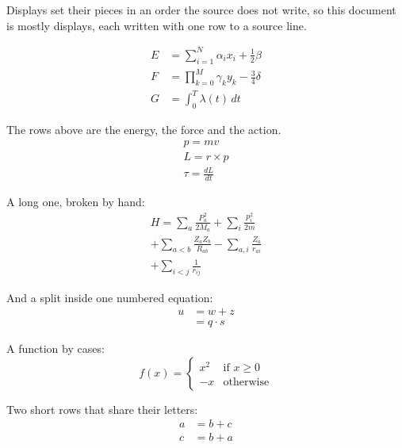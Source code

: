 \documentclass{article}
\begin{document}
Displays set their pieces in an order the source does not write, so this
document is mostly displays, each written with one row to a source line.

\begin{align}
  E &= \sum_{i=1}^{N} \alpha_i x_i + \frac{1}{2} \beta \\
  F &= \prod_{k=0}^{M} \gamma_k y_k - \frac{3}{4} \delta \\
  G &= \int_{0}^{T} \lambda(t) \, dt
\end{align}

The rows above are the energy, the force and the action.
\begin{gather}
  p = m v \\
  L = r \times p \\
  \tau = \frac{dL}{dt}
\end{gather}

A long one, broken by hand:
\begin{multline}
  H = \sum_{a} \frac{P_a^2}{2 M_a} + \sum_{i} \frac{p_i^2}{2 m} \\
  + \sum_{a<b} \frac{Z_a Z_b}{R_{ab}} - \sum_{a,i} \frac{Z_a}{r_{ai}} \\
  + \sum_{i<j} \frac{1}{r_{ij}}
\end{multline}

And a split inside one numbered equation:
\begin{equation}
  \begin{split}
    u &= w + z \\
      &= q \cdot s
  \end{split}
\end{equation}

A function by cases:
\begin{equation}
  f(x) =
  \begin{cases}
    x^2 & \text{if } x \ge 0 \\
    -x & \text{otherwise}
  \end{cases}
\end{equation}

Two short rows that share their letters:
\begin{align}
  a &= b + c \\
  c &= b + a
\end{align}
\end{document}
